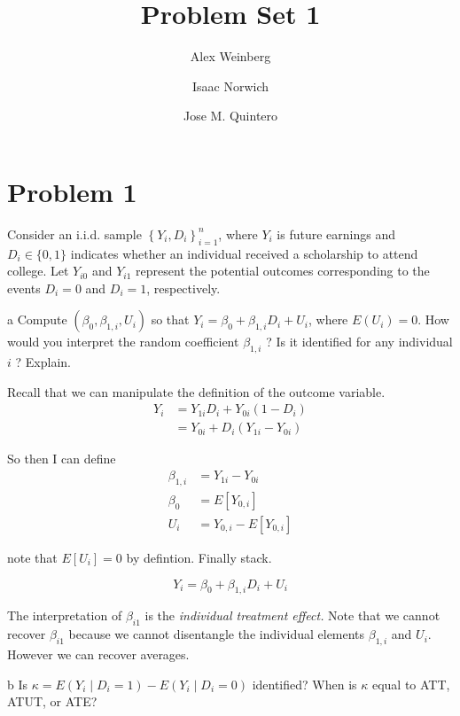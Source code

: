 \documentclass{article}
\title{Problem Set 1}
\author{Alex Weinberg \and Isaac Norwich \and Jose M. Quintero}
\begin{document}
\maketitle
\section*{Problem 1}
Consider an i.i.d. sample $\left\{Y_{i}, D_{i}\right\}_{i=1}^{n}$, where $Y_{i}$ is future earnings and $D_{i} \in\{0,1\}$ indicates whether an individual received a scholarship to attend college. Let $Y_{i 0}$ and $Y_{i 1}$ represent the potential outcomes corresponding to the events $D_{i}=0$ and $D_{i}=1$, respectively.

\begin{problem}{a}
 Compute $\left(\beta_{0}, \beta_{1, i}, U_{i}\right)$ so that $Y_{i}=\beta_{0}+\beta_{1, i} D_{i}+U_{i}$, where $E\left(U_{i}\right)=0$. How would you interpret the random coefficient $\beta_{1, i}$ ? Is it identified for any individual $i$ ? Explain. 
\end{problem}
\begin{solution}
Recall that we can manipulate the definition of the outcome variable.
\begin{align*}
Y_{i} & =Y_{1i}D_{i}+Y_{0i}\left(1-D_{i}\right)\\
 & =Y_{0i}+D_{i}\left(Y_{1i}-Y_{0i}\right)
\end{align*}

So then I can define
\begin{align*}
\beta_{1,i} & =Y_{1i}-Y_{0i}\\
\beta_{0} & =E\left[Y_{0,i}\right]\\
U_{i} & =Y_{0,i}-E\left[Y_{0,i}\right]
\end{align*}

note that $E\left[U_{i}\right]=0$ by defintion. Finally stack.

\[
\ensuremath{Y_{i}=\beta_{0}+\beta_{1,i}D_{i}+U_{i}}
\]

The interpretation of $\beta_{i1}$ is the \emph{individual treatment
effect. }Note that we cannot recover $\beta_{i1}$ because we cannot
disentangle the individual elements $\beta_{1,i}$ and $U_{i}$. However
we can recover averages. 
\end{solution}
\begin{problem}{b}
Is $\kappa=E\left(Y_{i} \mid D_{i}=1\right)-E\left(Y_{i} \mid D_{i}=0\right)$ identified? When is $\kappa$ equal to ATT, ATUT, or ATE? \end{problem}
\end{document}
